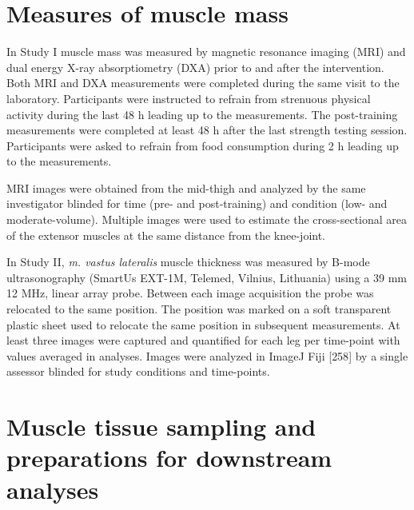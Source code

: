\documentclass[twoside,10pt]{gihclass} %
\begin{document}
\hypertarget{measures-of-muscle-mass}{%
\section{Measures of muscle mass}\label{measures-of-muscle-mass}}

In Study I muscle mass was measured by magnetic resonance imaging (MRI)
and dual energy X-ray absorptiometry (DXA) prior to and after the
intervention. Both MRI and DXA measurements were completed during the
same visit to the laboratory. Participants were instructed to refrain
from strenuous physical activity during the last 48 h leading up to the
measurements. The post-training measurements were completed at least 48
h after the last strength testing session. Participants were asked to
refrain from food consumption during 2 h leading up to the measurements.

MRI images were obtained from the mid-thigh and analyzed by the same
investigator blinded for time (pre- and post-training) and condition
(low- and moderate-volume). Multiple images were used to estimate the
cross-sectional area of the extensor muscles at the same distance from
the knee-joint.

In Study II, \emph{m. vastus lateralis} muscle thickness was measured by B-mode ultrasonography (SmartUs EXT-1M, Telemed, Vilnius, Lithuania) using a 39 mm 12 MHz, linear array probe. Between each image acquisition the probe was relocated to the same position. The position was marked on a soft transparent plastic sheet used to relocate the same position in subsequent measurements.
At least three images were captured and quantified for each leg per time-point with values averaged in analyses. Images were analyzed in ImageJ Fiji {[}258{]} by a single assessor blinded for study conditions and time-points.

\hypertarget{muscle-tissue-sampling-and-preparations-for-downstream-analyses}{%
\section{Muscle tissue sampling and preparations for downstream analyses}\label{muscle-tissue-sampling-and-preparations-for-downstream-analyses}}
\end{document}
